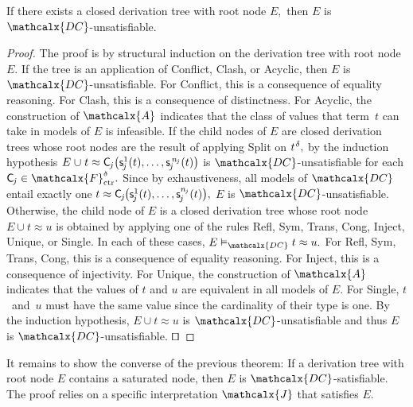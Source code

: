 \documentclass[smallcondensed,draft]{svjour3}
\newcommand\DISC[1]{t \teq \const{C}_{#1}\negvthinspace\bigl(\const s^1_{#1}( t ), \ldots,\const s^{n_{#1}}_{#1}( t )\bigr)}
\newcommand\typ[1]{^{\vthinspace #1}}
\newcommand\afterDot{\;} %
\newcommand\const[1]{\textsf{#1}}
\newcommand\xqed{{\hfill$\scriptstyle\squareforqed$}}
\newcommand{\Ec}{E}
\newcommand{\rn}[1]{\textsf{#1}}
\newcommand{\teq}{\approx}
\newcommand{\J}{\mathcalx{J}}
\newcommand{\Val}{\mathcalx{A}\vvthinspace}
\newcommand{\thD}{\mathcalx{DC}}
\newcommand\Funcs{\mathcalx{F}}
\newcommand\Ctr{\Funcs_{\smash{\mathrm{ctr}}}}
\newcommand\vvthinspace{\kern+0.041667em}
\newcommand\vthinspace{\kern+0.083333em}
\newcommand\negvthinspace{\kern-0.083333em}
\begin{document}
\begin{theorem}%
\label{thm:rs}%
\afterDot
If there exists a closed derivation tree with root node\/ $\Ec,$ then\/ $\Ec$ is $\thD$-unsatisfiable.
\end{theorem}
\begin{proof}
The proof is by structural induction on the derivation tree with root node $\Ec.$
If the tree is an application of \rn{Conflict}, \rn{Clash}, or \rn{Acyclic},
then $\Ec$ is $\thD$-unsatisfiable.
For \rn{Conflict}, this is a consequence of equality reasoning.
For \rn{Clash}, this is a consequence of distinctness.
For \rn{Acyclic}, the construction of $\Val$ indicates that the class of values that term~$t$ can take in models of $\Ec$ is infeasible.
If the child nodes of $\Ec$ are closed derivation trees
whose root nodes are the result of applying \rn{Split} on $t\typ{\delta},$
by the induction hypothesis $\Ec \mathrel\cup t \teq \smash{\const C_{\negvthinspace j}\bigl( \const s^1_{\negvthinspace j}( t ), \ldots, \const s^{\,\smash{n_{\negvthinspace j}}}_{\negvthinspace j}( t ) \bigr)}$ is
$\thD$-unsatisfiable
for each $\const C_{\negvthinspace j} \in \smash{\Ctr^\delta}.$
Since by exhaustiveness, all models of $\thD$ entail exactly one
$\DISC{\negvthinspace j},$
$\Ec$ is $\thD$-unsatisfiable.
Otherwise, the child node of $\Ec$ is a closed derivation tree
whose root
node $\Ec \mathrel\cup t \teq u$ is obtained by applying one of the rules \rn{Refl}, \rn{Sym}, \rn{Trans}, \rn{Cong}, \rn{Inject}, \rn{Unique}, or \rn{Single}.
In each of these cases, $\Ec \vDash_{\thD} t \teq u.$
For \rn{Refl}, \rn{Sym}, \rn{Trans}, \rn{Cong}, this is a consequence of equality reasoning.
For \rn{Inject}, this is a consequence of injectivity.
For \rn{Unique}, the construction of $\Val$ indicates that the values of $t$ and $u$ are equivalent in all models of $\Ec.$
For \rn{Single}, $t$~and~$u$ must have the same value since the cardinality of their type is one.
By the induction hypothesis, $\Ec \mathrel\cup t \teq u$ is $\thD$-unsatisfiable
and thus $\Ec$ is $\thD$-unsatisfiable.
\xqed
\end{proof}

It remains to show the converse of the previous theorem: If a derivation tree
with root node $\Ec$ contains a saturated node, then $\Ec$ is
$\thD$-satisfiable.
The proof relies on a specific interpretation $\J$ that satisfies $\Ec.$
\end{document}
